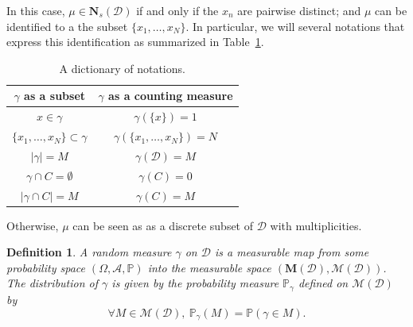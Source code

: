 \documentclass[twoside,11pt]{book}
\newtheorem{definition}{Definition}
\numberwithin{theorem}{chapter}
\numberwithin{definition}{chapter}
\numberwithin{proposition}{chapter}
\numberwithin{corollary}{chapter}
\numberwithin{example}{chapter}
\numberwithin{lemma}{chapter}
\numberwithin{assumption}{chapter}
\begin{document}
In this case, $\mu \in \mathbf{N}_s(\mathcal{D})$ if and only if the $x_{n}$ are pairwise distinct; and $\mu$ can be identified to a the subset $\{x_{1}, \dots, x_{N}\}$. In particular, we will several notations that express this identification as summarized in Table~\ref{table:set_counting_measure_dictionary}.
\begin{table}
\centering
 \begin{tabular}{| c| c|}
 \hline
  $\gamma$ as a subset & $\gamma$ as a counting measure\\
 \hline
 $x \in \gamma$ & $\gamma(\{x\}) = 1$\\
 \hline
 $\{ x_1, \dots, x_{N} \} \subset \gamma$ & $\gamma(\{ x_1, \dots, x_{N} \}) = N$\\
 \hline
  $|\gamma| = M$ & $\gamma(\mathcal{D}) = M$\\
\hline
  $\gamma \cap C = \emptyset$ & $\gamma(C) = 0$\\
 \hline
  $|\gamma \cap C| = M$ & $\gamma(C) = M$\\
 \hline
\end{tabular}
\caption{A dictionary of notations.\label{table:set_counting_measure_dictionary}}
\end{table}
Otherwise, $\mu$ can be seen as as a discrete subset of $\mathcal{D}$ with multiplicities.




\begin{definition}
A random measure $\gamma$ on $\mathcal{D}$ is a measurable map from some probability space $(\Omega, \mathcal{A}, \mathbb{P})$  into the measurable space $(\mathbf{M}(\mathcal{D}), \mathcal{M}(\mathcal{D}))$. The distribution of $\gamma$ is given by the probability measure $\mathbb{P}_{\gamma}$ defined on $\mathcal{M}(\mathcal{D})$ by
\begin{equation}
\forall M \in \mathcal{M}(\mathcal{D}), \:\mathbb{P}_{\gamma}(M) = \mathbb{P}(\gamma \in M).
\end{equation}

\end{definition}
\end{document}
